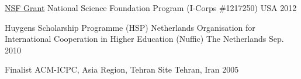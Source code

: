 

\begin{cvhonors}

  \cvhonor
    {\href{https://www.nsf.gov/awardsearch/showAward?AWD_ID=1217250}{NSF Grant}} %
    {National Science Foundation Program (I-Corps \#1217250)} %
    {USA} %
    {2012} %

  \cvhonor
    {Huygens Scholarship Programme (HSP)} %
    {Netherlands Organisation for International Cooperation in Higher Education (Nuffic)} %
    {The Netherlands} %
    {Sep. 2010} %

  \cvhonor
    {Finalist} %
    {ACM-ICPC, Asia Region, Tehran Site} %
    {Tehran, Iran} %
    {2005} %

\end{cvhonors}

